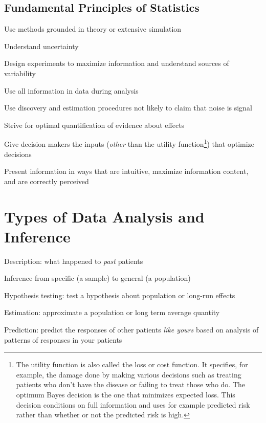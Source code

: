 \subsection{Fundamental Principles of Statistics}
\bi
\item Use methods grounded in theory or extensive simulation
\item Understand uncertainty
\item Design experiments to maximize information and understand
  sources of variability
\item Use all information in data during analysis
\item Use discovery and estimation procedures not likely to claim that
  noise is signal
\item Strive for optimal quantification of evidence about effects
\item Give decision makers the inputs (\emph{other} than the utility
  function\footnote{The utility function is also called the loss or
    cost function.  It specifies, for example, the damage done by
    making various decisions such as treating patients who don't have
    the disease or failing to treat those who do.  The optimum Bayes
    decision is the one that minimizes expected loss.  This decision
    conditions on full information and uses for example predicted risk
    rather than whether or not the predicted risk is high.}) that
  optimize decisions
\item Present information in ways that are intuitive, maximize
  information content, and are correctly perceived
\ei


\section{Types of Data Analysis and Inference}\label{sec:overview-datatypes}
 \bi
 \item Description: what happened to \emph{past} patients
 \item Inference from specific (a sample) to general (a population)
 \bi
  \item Hypothesis testing: test a hypothesis about population or
   long-run effects
  \item Estimation: approximate a population or long term average
   quantity
  \item Prediction: predict the responses of other patients \emph{like yours}
   based on analysis of patterns of responses in your patients
  \ei
\ei

